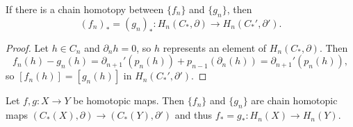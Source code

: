\begin{lemma}
  If there is a chain homotopy between
  $\{f_n\}$ and $\{g_n\}$, then
  \[(f_n)_* = (g_n)_* : H_n(C_*, \partial) \to H_n(C_*', \partial').\]
\end{lemma}

\begin{proof}
  Let $h \in C_n$ and $\partial_n h = 0$, so
  $h$ represents an element of $H_n(C_*, \partial)$.
  Then
  \[
    f_n(h) - g_n(h)
    = \partial_{n + 1}'(p_n(h)) + p_{n - 1}(\partial_n (h))
    = \partial_{n + 1}'(p_n(h)),
  \]
  so $[f_n(h)] = [g_n(h)]$ in $H_n(C_*', \partial')$.
\end{proof}

\begin{theorem}
  Let $f, g : X \to Y$ be homotopic maps.
  Then $\{f_n\}$ and $\{g_n\}$ are chain homotopic
  maps $(C_*(X), \partial) \to (C_*(Y), \partial')$
  and thus $f_* = g_* : H_n(X) \to H_n(Y)$.
\end{theorem}

